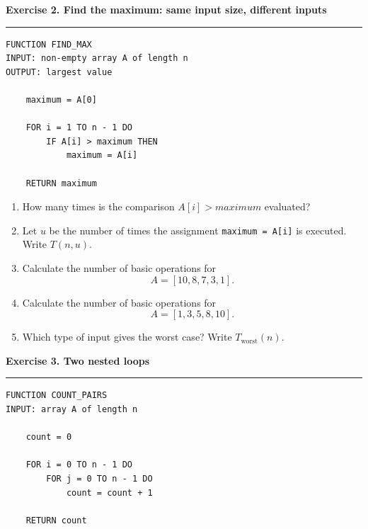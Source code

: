 \documentclass[11pt,a4paper]{article}
\newcommand{\exercise}[1]{%
  \vspace{0.7em}
  {\large\bfseries\color{ForestGreen}#1}
  \vspace{0.2em}
  \hrule
  \vspace{0.5em}
}
\begin{document}
\exercise{Exercise 2. Find the maximum: same input size, different inputs}

\begin{lstlisting}[style=pseudo]
FUNCTION FIND_MAX
INPUT: non-empty array A of length n
OUTPUT: largest value

    maximum = A[0]

    FOR i = 1 TO n - 1 DO
        IF A[i] > maximum THEN
            maximum = A[i]

    RETURN maximum
\end{lstlisting}

\begin{enumerate}
    \item How many times is the comparison $A[i] > maximum$ evaluated?

    \item Let $u$ be the number of times the assignment
    \texttt{maximum = A[i]} is executed. Write $T(n,u)$.

    \item Calculate the number of basic operations for
    \[
        A=[10,8,7,3,1].
    \]

    \item Calculate the number of basic operations for
    \[
        A=[1,3,5,8,10].
    \]

    \item Which type of input gives the worst case?
    Write $T_{\mathrm{worst}}(n)$.
\end{enumerate}

\exercise{Exercise 3. Two nested loops}

\begin{lstlisting}[style=pseudo]
FUNCTION COUNT_PAIRS
INPUT: array A of length n

    count = 0

    FOR i = 0 TO n - 1 DO
        FOR j = 0 TO n - 1 DO
            count = count + 1

    RETURN count
\end{lstlisting}
\end{document}
